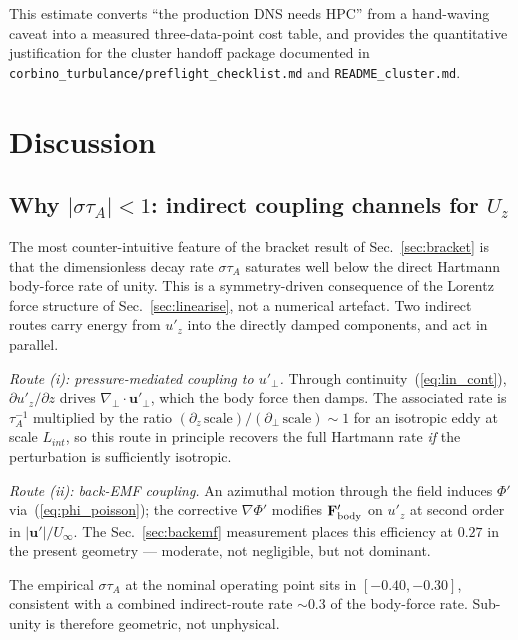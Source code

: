 \documentclass[aps,prl,twocolumn,superscriptaddress]{revtex4-2}
\begin{document}
This estimate converts ``the production DNS needs HPC'' from a
hand-waving caveat into a measured three-data-point cost table, and
provides the quantitative justification for the cluster handoff
package documented in \texttt{corbino\_turbulance/preflight\_checklist.md}
and \texttt{README\_cluster.md}.


\section{Discussion}

\subsection{Why $|\sigma\tau_A| < 1$: indirect coupling channels for
$U_z$}
\label{sec:disc_indirect}

The most counter-intuitive feature of the bracket result of
Sec.~\ref{sec:bracket} is that the dimensionless decay rate
$\sigma\tau_A$ saturates well below the direct Hartmann body-force
rate of unity.  This is a symmetry-driven consequence of the Lorentz
force structure of Sec.~\ref{sec:linearise}, not a numerical
artefact.  Two indirect routes carry energy from $u'_z$ into the
directly damped components, and act in parallel.

\textit{Route (i): pressure-mediated coupling to $u'_\perp$.}
Through continuity~(\ref{eq:lin_cont}),
$\partial u'_z/\partial z$ drives
$\nabla_\perp\!\cdot\!\mathbf{u}'_\perp$, which the body force then
damps.  The associated rate is $\tau_A^{-1}$ multiplied by the ratio
$(\partial_z\,\text{scale})/(\partial_\perp\,\text{scale})\sim 1$ for
an isotropic eddy at scale $L_{int}$, so this route in principle
recovers the full Hartmann rate \emph{if} the perturbation is
sufficiently isotropic.

\textit{Route (ii): back-EMF coupling.}  An azimuthal motion through
the field induces $\Phi'$ via~(\ref{eq:phi_poisson}); the corrective
$\nabla\Phi'$ modifies $\mathbf{F}'_{\rm body}$ on $u'_z$ at second
order in $|\mathbf{u}'|/U_\infty$.  The Sec.~\ref{sec:backemf}
measurement places this efficiency at $0.27$ in the present geometry
--- moderate, not negligible, but not dominant.

The empirical $\sigma\tau_A$ at the nominal operating point sits in
$[-0.40,-0.30]$, consistent with a combined indirect-route rate
$\sim\!0.3$ of the body-force rate.  Sub-unity is therefore
geometric, not unphysical.
\end{document}
